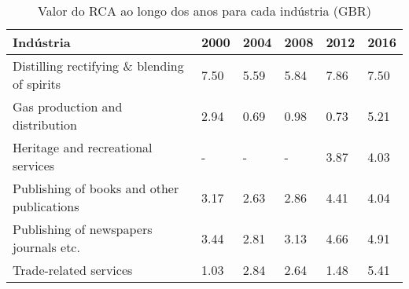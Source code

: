 \begin{table}
\centering
\caption{Valor do RCA ao longo dos anos para cada indústria (GBR)}
\begin{tabular}{p{6cm}p{1.5cm}p{1.5cm}p{1.5cm}p{1.5cm}p{1.5cm}}
\toprule
                                  Indústria & 2000 & 2004 & 2008 & 2012 & 2016 \\
\midrule
Distilling rectifying \& blending of spirits & 7.50 & 5.59 & 5.84 & 7.86 & 7.50 \\
            Gas production and distribution & 2.94 & 0.69 & 0.98 & 0.73 & 5.21 \\
         Heritage and recreational services &    - &    - &    - & 3.87 & 4.03 \\
 Publishing of books and other publications & 3.17 & 2.63 & 2.86 & 4.41 & 4.04 \\
     Publishing of newspapers journals etc. & 3.44 & 2.81 & 3.13 & 4.66 & 4.91 \\
                     Trade-related services & 1.03 & 2.84 & 2.64 & 1.48 & 5.41 \\
\bottomrule
\end{tabular}
\end{table}
